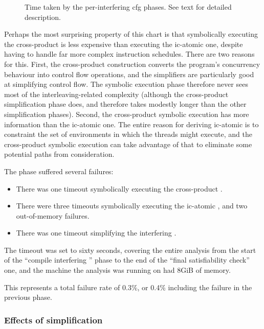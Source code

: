 \begin{figure}
  
  \caption{Time taken by the per-interfering \gls{cfg} phases.  See
    text for detailed description.}
  \label{fig:eval:time_breakdown:interfering}
\end{figure}

Perhaps the most surprising property of this chart is that
symbolically executing the cross-product {\StateMachine} is less
expensive than executing the \gls{ic-atomic} one, despite having to
handle far more complex instruction schedules.  There are two reasons
for this.  First, the cross-product construction converts the
program's concurrency behaviour into control flow operations, and the
{\StateMachine} simplifiers are particularly good at simplifying
control flow.  The symbolic execution phase therefore never sees most
of the interleaving-related complexity (although the cross-product
simplification phase does, and therefore takes modestly longer than
the other simplification phases).  Second, the cross-product symbolic
execution has more information than the \gls{ic-atomic} one.  The
entire reason for deriving \gls{ic-atomic} is to constraint the set of
environments in which the threads might execute, and the cross-product
symbolic execution can take advantage of that to eliminate some
potential paths from consideration.

The phase suffered several failures:

\begin{itemize}
\item There was one timeout symbolically executing the cross-product
  {\StateMachine}.
\item There were three timeouts symbolically executing the \gls{ic-atomic}
  {\StateMachine}, and two out-of-memory failures.
\item There was one timeout simplifying the interfering
  {\StateMachine}.
\end{itemize}

The timeout was set to sixty seconds, covering the entire analysis
from the start of the ``compile interfering {\StateMachine}'' phase to
the end of the ``final satisfiability check'' one, and the machine the
analysis was running on had 8GiB of memory.

This represents a total failure rate of 0.3\%, or 0.4\% including the
failure in the previous phase.  

\subsubsection{Effects of {\StateMachine} simplification}

